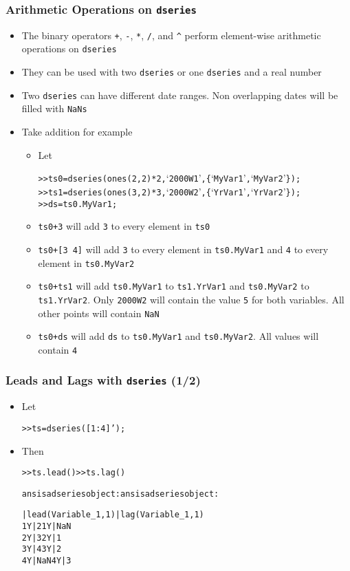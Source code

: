\documentclass[10pt]{beamer}
\newcommand{\myitem}{\item[$\bullet$]}
\begin{document}
\begin{frame}[fragile,t]
  \frametitle{Arithmetic Operations on \texttt{dseries}}
  \begin{itemize}
    \myitem The binary operators \texttt{+}, \texttt{-}, \texttt{*},
    \texttt{/}, and \texttt{\string^} perform element-wise arithmetic operations on
    \texttt{dseries}
    \myitem They can be used with two \texttt{dseries} or one \texttt{dseries}
    and a real number
    \myitem Two \texttt{dseries} can have different date ranges. Non overlapping dates will be filled with \texttt{NaNs}
    \myitem Take addition for example
    \begin{itemize}
      \myitem Let
    \begin{alltt}
>> ts0 = dseries(ones(2,2)*2, `2000W1', \{`MyVar1', `MyVar2'\});
>> ts1 = dseries(ones(3,2)*3, `2000W2', \{`YrVar1', `YrVar2'\});
>> ds = ts0.MyVar1;
    \end{alltt}
    \myitem \texttt{ts0+3} will add \texttt{3} to every element in \texttt{ts0}
    \myitem \texttt{ts0+[3 4]} will add \texttt{3} to every element in \texttt{ts0.MyVar1} and \texttt{4} to every element in \texttt{ts0.MyVar2}
    \myitem \texttt{ts0+ts1} will add \texttt{ts0.MyVar1} to \texttt{ts1.YrVar1} and \texttt{ts0.MyVar2} to \texttt{ts1.YrVar2}. Only \texttt{2000W2} will contain the value \texttt{5} for both variables. All other points will contain \texttt{NaN}
    \myitem \texttt{ts0+ds} will add \texttt{ds} to \texttt{ts0.MyVar1} and \texttt{ts0.MyVar2}. All values will contain \texttt{4}
    \end{itemize}
  \end{itemize}
\end{frame}



\begin{frame}[fragile,t]
  \frametitle{Leads and Lags with \texttt{dseries} (1/2)}
  \begin{itemize}
    \myitem Let
    \begin{alltt}
  >> ts = dseries([1:4]');
    \end{alltt}
    \myitem Then
    \begin{alltt}
  >> ts.lead()                      >> ts.lag()

  ans is a dseries object:          ans is a dseries object:

     | lead(Variable_1,1)              | lag(Variable_1,1)
  1Y | 2                            1Y | NaN
  2Y | 3                            2Y | 1
  3Y | 4                            3Y | 2
  4Y | NaN                          4Y | 3
    \end{alltt}
  \end{itemize}
\end{frame}
\end{document}
